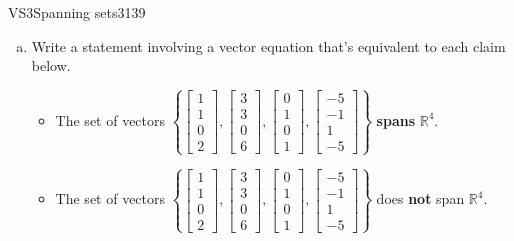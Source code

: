 \begin{exercise}{VS3}{Spanning sets}{3139} 
\begin{exerciseStatement} 

\begin{enumerate}[(a)]
\item  

 Write a statement involving a vector equation that's equivalent to each claim below. 

 

\begin{itemize}
\item  

 The set of vectors \(\left\{ \left[\begin{array}{c}
1 \\
1 \\
0 \\
2
\end{array}\right] , \left[\begin{array}{c}
3 \\
3 \\
0 \\
6
\end{array}\right] , \left[\begin{array}{c}
0 \\
1 \\
0 \\
1
\end{array}\right] , \left[\begin{array}{c}
-5 \\
-1 \\
1 \\
-5
\end{array}\right] \right\}\) \textbf{spans} \(\mathbb R^4\). 

 
\item  

 The set of vectors \(\left\{ \left[\begin{array}{c}
1 \\
1 \\
0 \\
2
\end{array}\right] , \left[\begin{array}{c}
3 \\
3 \\
0 \\
6
\end{array}\right] , \left[\begin{array}{c}
0 \\
1 \\
0 \\
1
\end{array}\right] , \left[\begin{array}{c}
-5 \\
-1 \\
1 \\
-5
\end{array}\right] \right\}\) does \textbf{not} span \(\mathbb R^4\). 


\end{itemize}
\end{enumerate}
\end{exerciseStatement}
\end{exercise}
